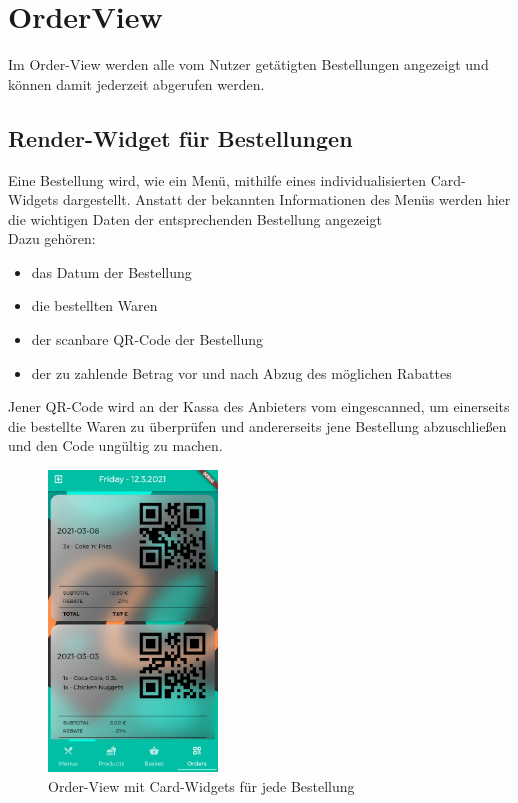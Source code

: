 \section{OrderView}

Im Order-View werden alle vom Nutzer getätigten Bestellungen angezeigt und können damit
jederzeit abgerufen werden.

\subsection{Render-Widget für Bestellungen}

Eine Bestellung wird, wie ein Menü, mithilfe eines individualisierten Card-Widgets
dargestellt.
Anstatt der bekannten Informationen des Menüs werden hier die wichtigen Daten der entsprechenden
Bestellung angezeigt\\
Dazu gehören:

\begin{itemize}
    \item das Datum der Bestellung
    \item die bestellten Waren
    \item der scanbare QR-Code der Bestellung
    \item der zu zahlende Betrag vor und nach Abzug des möglichen Rabattes
\end{itemize}

Jener QR-Code wird an der Kassa des Anbieters vom  eingescanned, um einerseits
die bestellte Waren zu überprüfen und andererseits jene Bestellung abzuschließen und den Code
ungültig zu machen.

\begin{figure}[H]
    \centering
    \includegraphics[width=0.40\textwidth]{images/Client/views/orderview/orderview.png}
    \caption{Order-View mit Card-Widgets für jede Bestellung}
\end{figure}

